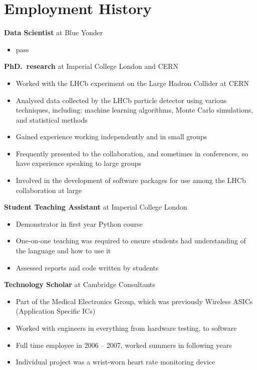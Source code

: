 \section{Employment History}

{
  \textbf{Data Scientist} at Blue Yonder
  \begin{itemize}
    \item pass
  \end{itemize}
}

\vspace{-1em}

{
  \textbf{PhD.~research} at Imperial College London and CERN
  \begin{itemize}
    \item Worked with the LHCb experiment on the Large Hadron Collider at CERN
    \item Analysed data collected by the LHCb particle detector using various techniques,
      including: machine learning algorithms, Monte Carlo simulations, and statistical methods
    \item Gained experience working independently and in small groups
    \item Frequently presented to the collaboration, and sometimes in conferences, so have
      experience speaking to large groups
    \item Involved in the development of software packages for use among the LHCb collaboration
      at large
  \end{itemize}
}

\vspace{-1em}

{
  \textbf{Student Teaching Assistant} at Imperial College London
  \begin{itemize}
    \item Demonstrator in first year Python course
    \item One-on-one teaching was required to ensure students had understanding
      of the language and how to use it
    \item Assessed reports and code written by students
  \end{itemize}
}

\vspace{-1em}

{
  \textbf{Technology Scholar} at Cambridge Consultants
  \begin{itemize}
    \item Part of the Medical Electronics Group, which was previously Wireless ASICs (Application
      Specific ICs)
    \item Worked with engineers in everything from hardware testing, to software
    \item Full time employee in 2006 -- 2007, worked summers in following years
    \item Individual project was a wrist-worn heart rate monitoring device
  \end{itemize}
}


